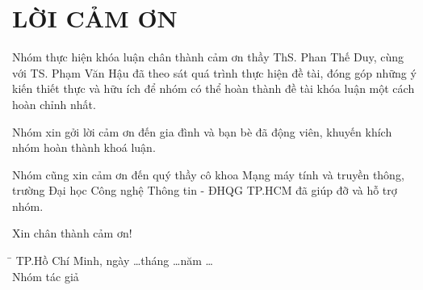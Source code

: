 \documentclass[../main-report.tex]{subfiles}
\begin{document}
\part*{LỜI CẢM ƠN}
Nhóm thực hiện khóa luận chân thành cảm ơn thầy ThS. Phan Thế Duy, cùng với TS. Phạm Văn Hậu đã  theo sát quá trình thực hiện đề tài, đóng góp những ý kiến thiết thực và hữu ích để nhóm có thể hoàn thành đề tài khóa luận một cách hoàn chỉnh nhất.

Nhóm xin gởi lời cảm ơn đến gia đình và bạn bè đã động viên, khuyến khích nhóm hoàn thành khoá luận.

Nhóm cũng xin cảm ơn đến quý thầy cô khoa Mạng máy tính và truyền thông, trường Đại học Công nghệ Thông tin - ĐHQG TP.HCM đã giúp đỡ và hỗ trợ nhóm.

Xin chân thành cảm ơn!

\begin{tabbing}
\hspace{7cm}\=\kill
  \> TP.Hồ Chí Minh, ngày \ldots tháng \ldots năm \ldots \\
  \> \hspace{2cm} Nhóm tác giả
\end{tabbing} 
\end{document}
